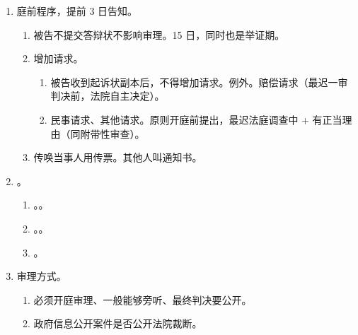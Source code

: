 \begin{enumerate}
\begin{enumerate}
\begin{enumerate}
\begin{enumerate}
                          \item 非法院主管。。
                          \item 诉哪个审哪个判哪个。。
                        \end{enumerate}
                  \item 两审终审。除被告都能上诉（对被告是一审终审制）。
                \end{enumerate}
          \item 庭前程序，提前 3 日告知。
                \begin{enumerate}
                  \item 被告不提交答辩状不影响审理。15 日，同时也是举证期。
                  \item 增加请求。
                        \begin{enumerate}
                          \item 被告收到起诉状副本后，不得增加请求。例外。赔偿请求（最迟一审判决前，法院自主决定）。
                          \item 民事请求、其他请求。原则开庭前提出，最迟法庭调查中 + 有正当理由（同附带性审查）。
                        \end{enumerate}
                  \item 传唤当事人用传票。其他人叫通知书。
                \end{enumerate}
          \item {}。
                \begin{enumerate}
                  \item {}。。
                  \item {}。。
                  \item {}。
                \end{enumerate}
          \item 审理方式。
                \begin{enumerate}
                  \item 必须开庭审理、一般能够旁听、最终判决要公开。
                  \item 政府信息公开案件是否公开法院裁断。

\end{enumerate}
\end{enumerate}
\end{enumerate}
